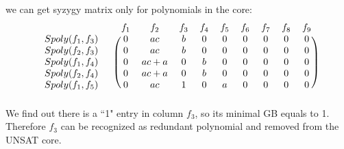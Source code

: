 \begin{example}
 we can get syzygy matrix only for polynomials
 in the core:
  \[
 \begin{blockarray}{ccccccccccc}
  && f_1 & f_2 & f_3 & f_4 & f_5 & f_6 & f_7 & f_8 & f_9  \\
  \begin{block}{cc(ccccccccc)}
  Spoly(f_1,f_3)\ & & 0 & ac & b &0&0&0&0&0&0\\
  Spoly(f_2,f_3)\  && 0 & ac & b &0&0&0&0&0&0\\
  Spoly(f_1,f_4)\  && 0 & ac+a & 0 &b&0&0&0&0&0\\
  Spoly(f_2,f_4)\  && 0 & ac+a & 0 &b&0&0&0&0&0\\
  Spoly(f_1,f_5)\  && 0 & ac & 1 &0&a&0&0&0&0\\
  \end{block}
  \end{blockarray}
 \]
 We find out there is a ``1" entry in column $f_3$, so 
 its minimal GB equals to 1. Therefore $f_3$ can be
 recognized as redundant polynomial and removed from the UNSAT core. 
 
 \end{example}
